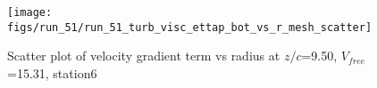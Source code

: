\begin{figure}[H]
\centering
\texttt{[image: figs/run\_51/run\_51\_turb\_visc\_ettap\_bot\_vs\_r\_mesh\_scatter]}
\caption{Scatter plot of velocity gradient term vs radius at $z/c$=9.50, $V_{free}$=15.31, station6}
\label{fig:run_51_turb_visc_ettap_bot_vs_r_mesh_scatter}
\end{figure}


